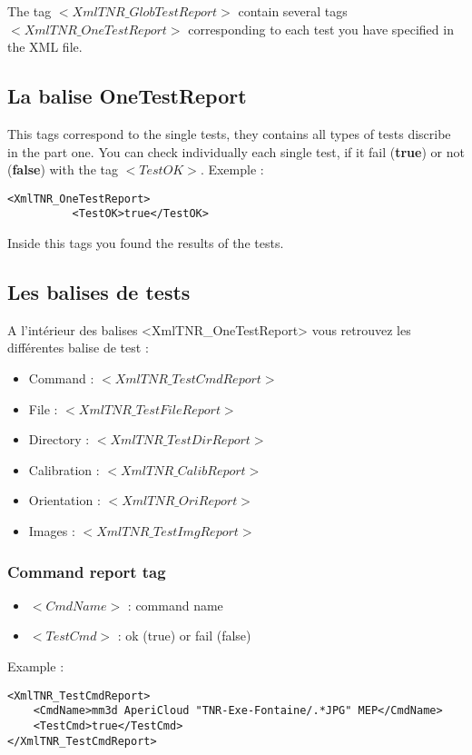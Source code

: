 \documentclass[a4paper]{book}
\begin{document}
The tag $<XmlTNR\_GlobTestReport>$ contain several tags $<XmlTNR\_OneTestReport>$ corresponding to each test you have specified in the XML file.
 
\subsection{La balise OneTestReport}
This tags correspond to the single tests, they contains all types of tests discribe in the part one. You can check individually each single test, if it fail (\textbf{true}) or not (\textbf{false}) with the tag $<TestOK>$.
Exemple :
\begin{lstlisting}
<XmlTNR_OneTestReport>
          <TestOK>true</TestOK>
\end{lstlisting}
Inside this tags you found the results of the tests.

\subsection{Les balises de tests}
A l’int\'erieur des balises <XmlTNR\_OneTestReport> vous retrouvez les diff\'erentes balise de test :
\begin{itemize}
\item Command : $<XmlTNR\_TestCmdReport>$
\item File : $<XmlTNR\_TestFileReport>$
\item Directory : $<XmlTNR\_TestDirReport>$
\item Calibration : $<XmlTNR\_CalibReport>$
\item Orientation : $<XmlTNR\_OriReport>$
\item Images : $<XmlTNR\_TestImgReport>$
\end{itemize}

\subsubsection{Command report tag}
\begin{itemize}
\item $<CmdName>$ : command name
\item $<TestCmd>$ :  ok (true) or fail (false)\\
\end{itemize}

Example : 
\begin{lstlisting}
<XmlTNR_TestCmdReport>
	<CmdName>mm3d AperiCloud "TNR-Exe-Fontaine/.*JPG" MEP</CmdName>
	<TestCmd>true</TestCmd>
</XmlTNR_TestCmdReport>
\end{lstlisting}
\end{document}
